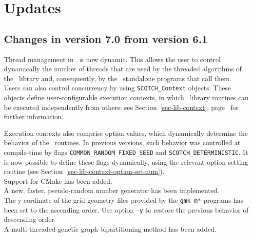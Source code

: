 
\section{Updates}
\label{sec-changes}

\subsection{Changes in version 7.0 from version 6.1}

Thread management in \scotch\ is now dynamic. This allows the user to
control dynamically the number of threads that are used by the
threaded algorithms of the \libscotch\ library and, consequently, by
the \scotch\ standalone programs that call them. Users can also
control concurrency by using \texttt{SCOTCH\_\lbt Context}
objects. These objects define user-configurable execution contexts, in
which \libscotch\ library routines can be executed independently from
others; see Section~\ref{sec-lib-context},
page~\pageref{sec-lib-context} for further information.

Execution contexts also comprise option values, which dynamically
determine the behavior of the \scotch\ routines. In previous versions,
such behavior was controlled at compile-time by flags
\texttt{COMMON\_\lbt RANDOM\_\lbt FIXED\_\lbt SEED} and
\texttt{SCOTCH\_\lbt DETERMINISTIC}. It is now possible to define
these flags dynamically, using the relevant option setting routine
(see Section~\ref{sec-lib-context-option-set-num}).
\\

Support for CMake has been added.
\\

A new, faster, pseudo-random number generator has been implemented.
\\

The y cordinate of the grid geometry files provided by the
\texttt{gmk\_m*} programs has been set to the ascending order. Use
option \texttt{-y} to restore the previous behavior of descending
order.
\\

A multi-threaded genetic graph bipartitioning method has been added.

